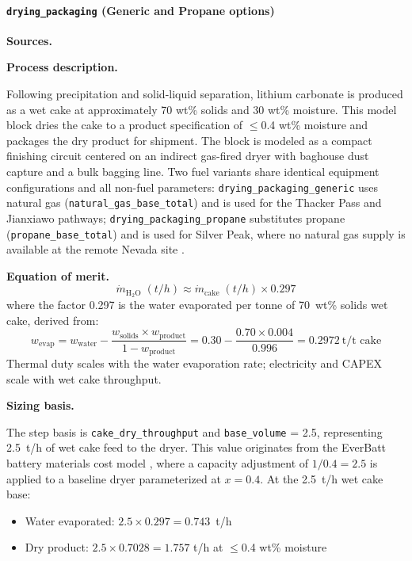 \clearpage
\paragraph{\texttt{drying\_packaging} (Generic and Propane options)}\label{app:04-methods-blockdefs-drypack}

\medskip
\noindent\textbf{Sources.}\quad

\citet{laneNI43101Technical2024, sgscanadaincSK1300Technical2024, riordanFalchaniLithiumProject2024, samariMineralResourceEstimate2024, srkconsultingSECTechnicalReport2023a, daiEverBattClosedloopBattery2019}

\medskip
\noindent\textbf{Process description.}\quad

Following precipitation and solid-liquid separation, lithium carbonate is produced as a wet cake at approximately 70 wt\% solids and 30 wt\% moisture. This model block dries the cake to a product specification of $\leq$0.4 wt\% moisture and packages the dry product for shipment. The block is modeled as a compact finishing circuit centered on an indirect gas-fired dryer with baghouse dust capture and a bulk bagging line. Two fuel variants share identical equipment configurations and all non-fuel parameters: \texttt{drying\_packaging\_generic} uses natural gas (\texttt{natural\_gas\_base\_total}) and is used for the Thacker Pass and Jianxiawo pathways; \texttt{drying\_packaging\_propane} substitutes propane (\texttt{propane\_base\_total}) and is used for Silver Peak, where no natural gas supply is available at the remote Nevada site \cite{srkconsultingSECTechnicalReport2023a}.

\medskip
\noindent\textbf{Equation of merit.}\quad
\[
	\dot{m}_{\text{H}_2\text{O}}\;(\si{t/h}) \approx \dot{m}_\text{cake}\;(\si{t/h}) \times 0.297
\]
where the factor 0.297 is the water evaporated per tonne of 70~wt\% solids wet cake, derived from:
\[
	w_\text{evap} = w_\text{water} - \frac{w_\text{solids} \times w_\text{product}}{1 - w_\text{product}}
	= 0.30 - \frac{0.70 \times 0.004}{0.996} = 0.2972~\text{t/t cake}
\]
Thermal duty scales with the water evaporation rate; electricity and CAPEX scale with wet cake throughput.

\medskip
\noindent\textbf{Sizing basis.}\quad

The step basis is \texttt{cake\_dry\_throughput} and \texttt{base\_volume} = 2.5, representing 2.5~t/h of wet cake feed to the dryer. This value originates from the EverBatt battery materials cost model \cite{daiEverBattClosedloopBattery2019}, where a capacity adjustment of $1/0.4 = 2.5$ is applied to a baseline dryer parameterized at $x = 0.4$. At the 2.5~t/h wet cake base:
\begin{itemize}[noitemsep]
	\item Water evaporated: $2.5 \times 0.297 = \mathbf{0.743}$~t/h
	\item Dry  product: $2.5 \times 0.7028 = 1.757$ t/h at $\leq$0.4 wt\% moisture
\end{itemize}

